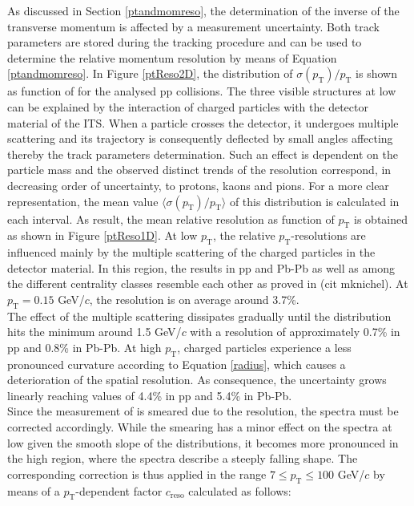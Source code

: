 \documentclass[12pt,a4paper]{report}
\begin{document}
\hspace{-0.3cm} As discussed in Section \ref{ptandmomreso}, the determination of the inverse of the transverse momentum is affected by a measurement uncertainty. Both track parameters are stored during the tracking procedure and can be used to determine the relative momentum resolution by means of Equation \ref{ptandmomreso}. In Figure \ref{ptReso2D}, the distribution of $\sigma(p_\text{T})/p_\text{T}$ is shown as function of \pt for the analysed pp collisions. The three visible structures at low \pt can be explained by the interaction of charged particles with the detector material of the ITS. When a particle crosses the detector, it undergoes multiple scattering and its trajectory is consequently deflected by small angles affecting thereby the track parameters determination. Such an effect is dependent on the particle mass and the observed distinct trends of the resolution correspond, in decreasing order of uncertainty, to protons, kaons and pions. For a more clear representation, the mean value $\langle\sigma(p_\text{T})/p_\text{T}\rangle$ of this distribution is calculated in each \pt interval. As result, the mean relative \pt resolution as function of $p_\text{T}$ is obtained as shown in Figure \ref{ptReso1D}. At low $p_\text{T}$, the relative $p_\text{T}$-resolutions are influenced mainly by the multiple scattering of the charged particles in the detector material. In this region, the results in pp and Pb-Pb as well as among the different centrality classes resemble each other as proved in (cit mknichel). At $p_\text{T} = 0.15$ GeV/$c$, the resolution is on average around 3.7\%.\\
The effect of the multiple scattering dissipates gradually until the distribution hits the minimum around 1.5 GeV/$c$ with a \pt resolution of approximately 0.7\% in pp and 0.8\% in Pb-Pb. At high $p_\text{T}$, charged particles experience a less pronounced curvature according to Equation \ref{radius}, which causes a deterioration of the spatial resolution. As consequence, the uncertainty grows linearly reaching values of 4.4\% in pp and 5.4\% in Pb-Pb.\\
Since the measurement of \pt is smeared due to the resolution, the \pt spectra must be corrected accordingly. While the smearing has a minor effect on the \pt spectra at low \pt given the smooth slope of the distributions, it becomes more pronounced in the high \pt region, where the \pt spectra describe a steeply falling shape. The corresponding correction is thus applied in the range $7 \leq p_\text{T} \leq 100$ GeV/$c$ by means of a $p_\text{T}$-dependent factor $c_\text{reso}$ calculated as follows: 
\end{document}
